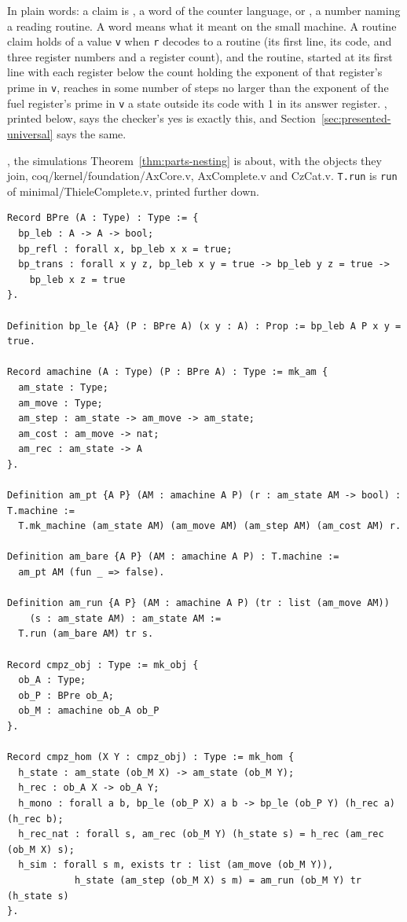 In plain words: a claim is , a word of the counter language, or , a
number naming a reading routine. A word means what it meant on the small machine. A routine claim
holds of a value \texttt{v} when \texttt{r} decodes to a routine (its first line, its code, and
three register numbers and a register count), and the routine, started at its first line with each
register below the count holding the exponent of that register's prime in \texttt{v}, reaches in
some number of steps no larger than the exponent of the fuel register's prime in \texttt{v} a state
outside its code with 1 in its answer register. , printed below, says the
checker's yes is exactly this, and Section~\ref{sec:presented-universal} says the same.

{\raggedright {}, the simulations Theorem~\ref{thm:parts-nesting} is about, with the
objects they join, coq/kernel/foundation/AxCore.v, AxComplete.v and CzCat.v. \texttt{T.run} is
\texttt{run} of minimal/ThieleComplete.v, printed further down.\par}

{\scriptsize
\begin{verbatim}
Record BPre (A : Type) : Type := {
  bp_leb : A -> A -> bool;
  bp_refl : forall x, bp_leb x x = true;
  bp_trans : forall x y z, bp_leb x y = true -> bp_leb y z = true ->
    bp_leb x z = true
}.

Definition bp_le {A} (P : BPre A) (x y : A) : Prop := bp_leb A P x y = true.

Record amachine (A : Type) (P : BPre A) : Type := mk_am {
  am_state : Type;
  am_move : Type;
  am_step : am_state -> am_move -> am_state;
  am_cost : am_move -> nat;
  am_rec : am_state -> A
}.

Definition am_pt {A P} (AM : amachine A P) (r : am_state AM -> bool) : T.machine :=
  T.mk_machine (am_state AM) (am_move AM) (am_step AM) (am_cost AM) r.

Definition am_bare {A P} (AM : amachine A P) : T.machine :=
  am_pt AM (fun _ => false).

Definition am_run {A P} (AM : amachine A P) (tr : list (am_move AM))
    (s : am_state AM) : am_state AM :=
  T.run (am_bare AM) tr s.

Record cmpz_obj : Type := mk_obj {
  ob_A : Type;
  ob_P : BPre ob_A;
  ob_M : amachine ob_A ob_P
}.

Record cmpz_hom (X Y : cmpz_obj) : Type := mk_hom {
  h_state : am_state (ob_M X) -> am_state (ob_M Y);
  h_rec : ob_A X -> ob_A Y;
  h_mono : forall a b, bp_le (ob_P X) a b -> bp_le (ob_P Y) (h_rec a) (h_rec b);
  h_rec_nat : forall s, am_rec (ob_M Y) (h_state s) = h_rec (am_rec (ob_M X) s);
  h_sim : forall s m, exists tr : list (am_move (ob_M Y)),
            h_state (am_step (ob_M X) s m) = am_run (ob_M Y) tr (h_state s)
}.
\end{verbatim}}


